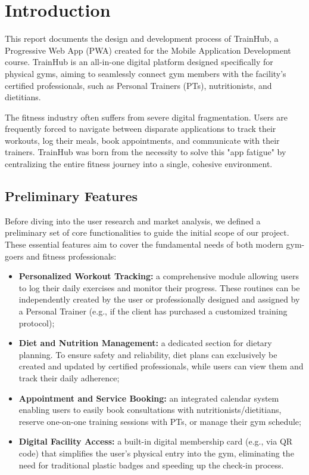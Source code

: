 \section{Introduction}\label{sect:Introduction}
This report documents the design and development process of TrainHub, a Progressive Web App (PWA) created for the Mobile Application Development course. TrainHub is an all-in-one digital platform designed specifically for physical gyms, aiming to seamlessly connect gym members with the facility's certified professionals, such as Personal Trainers (PTs), nutritionists, and dietitians.

The fitness industry often suffers from severe digital fragmentation. Users are frequently forced to navigate between disparate applications to track their workouts, log their meals, book appointments, and communicate with their trainers. TrainHub was born from the necessity to solve this "app fatigue" by centralizing the entire fitness journey into a single, cohesive environment.

\subsection{Preliminary Features}\label{subsect:PreliminaryFeatures}
Before diving into the user research and market analysis, we defined a preliminary set of core functionalities to guide the initial scope of our project. These essential features aim to cover the fundamental needs of both modern gym-goers and fitness professionals:

\begin{itemize}
    \item \textbf{Personalized Workout Tracking:} a comprehensive module allowing users to log their daily exercises and monitor their progress. These routines can be independently created by the user or professionally designed and assigned by a Personal Trainer (e.g., if the client has purchased a customized training protocol);
    \item \textbf{Diet and Nutrition Management:} a dedicated section for dietary planning. To ensure safety and reliability, diet plans can exclusively be created and updated by certified professionals, while users can view them and track their daily adherence;
    \item \textbf{Appointment and Service Booking:} an integrated calendar system enabling users to easily book consultations with nutritionists/dietitians, reserve one-on-one training sessions with PTs, or manage their gym schedule;
    \item \textbf{Digital Facility Access:} a built-in digital membership card (e.g., via QR code) that simplifies the user's physical entry into the gym, eliminating the need for traditional plastic badges and speeding up the check-in process.
\end{itemize}

